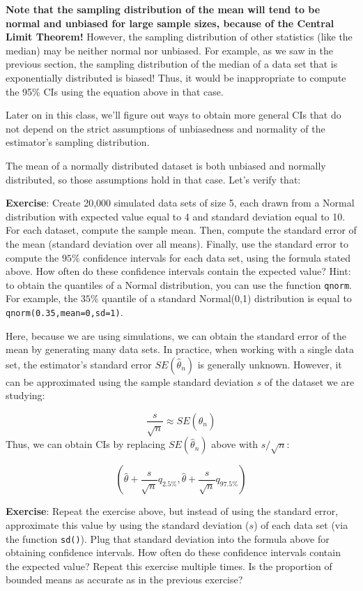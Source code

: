 \documentclass[
]{book}
\begin{document}
\textbf{Note that the sampling distribution of the mean will tend to be normal and unbiased for large sample sizes, because of the Central Limit Theorem!} However, the sampling distribution of other statistics (like the median) may be neither normal nor unbiased. For example, as we saw in the previous section, the sampling distribution of the median of a data set that is exponentially distributed is biased! Thus, it would be inappropriate to compute the 95\% CIs using the equation above in that case.

Later on in this class, we'll figure out ways to obtain more general CIs that do not depend on the strict assumptions of unbiasedness and normality of the estimator's sampling distribution.

The mean of a normally distributed dataset is both unbiased and normally distributed, so those assumptions hold in that case. Let's verify that:

\textbf{Exercise}: Create 20,000 simulated data sets of size 5, each drawn from a Normal distribution with expected value equal to 4 and standard deviation equal to 10. For each dataset, compute the sample mean. Then, compute the standard error of the mean (standard deviation over all means). Finally, use the standard error to compute the \(95\%\) confidence intervals for each data set, using the formula stated above. How often do these confidence intervals contain the expected value? Hint: to obtain the quantiles of a Normal distribution, you can use the function \texttt{qnorm}. For example, the \(35\%\) quantile of a standard Normal(0,1) distribution is equal to \texttt{qnorm(0.35,mean=0,sd=1)}.

Here, because we are using simulations, we can obtain the standard error of the mean by generating many data sets. In practice, when working with a single data set, the estimator's standard error \(SE(\hat{\theta}_n)\) is generally unknown. However, it can be approximated using the sample standard deviation \(s\) of the dataset we are studying:

\[\frac{s}{\sqrt{n}} \approx SE(\hat{\theta}_n)\]
Thus, we can obtain CIs by replacing \(SE(\hat{\theta}_n)\) above with \(s/\sqrt{n}\):

\[(\hat{\theta} + \frac{s}{\sqrt{n}}q_{2.5\%}, \hat{\theta} + \frac{s}{\sqrt{n}}q_{97.5\%})\]

\textbf{Exercise}: Repeat the exercise above, but instead of using the standard error, approximate this value by using the standard deviation (\(s\)) of each data set (via the function \texttt{sd()}). Plug that standard deviation into the formula above for obtaining confidence intervals. How often do these confidence intervals contain the expected value? Repeat this exercise multiple times. Is the proportion of bounded means as accurate as in the previous exercise?
\end{document}
